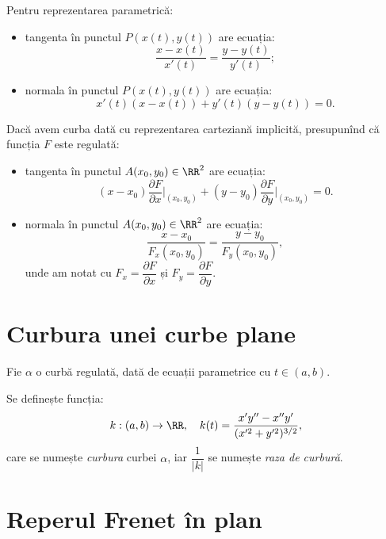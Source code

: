 Pentru reprezentarea parametrică:
\begin{itemize}
  \item tangenta în punctul $ P(x(t), y(t)) $ are ecuația:
    \[
      \dfrac{x - x(t)}{x'(t)} = \dfrac{y - y(t)}{y'(t)};
    \]
  \item normala în punctul $ P(x(t), y(t)) $ are ecuația:
    \[
      x'(t)(x - x(t)) + y'(t)(y - y(t)) = 0.
    \]
\end{itemize}

Dacă avem curba dată cu reprezentarea carteziană implicită, presupunînd că
funcția $ F $ este regulată:
\begin{itemize}
  \item tangenta în punctul $ A(x_0, y_0) \in \RR^2 $ are ecuația:
    \[
      (x - x_0) \dfrac{\partial F}{\partial x} \Big|_{(x_0, y_0)} + %
      (y - y_0) \dfrac{\partial F}{\partial y} \Big|_{(x_0, y_0)} = 0.
    \]
  \item normala în punctul $ A(x_0, y_0) \in \RR^2 $ are ecuația:
    \[
      \dfrac{x - x_0}{F_x(x_0, y_0)} = \dfrac{y - y_0}{F_y(x_0, y_0)},
    \]
    unde am notat cu $ F_x = \dfrac{\partial F}{\partial x} $ și
    $ F_y = \dfrac{\partial F}{\partial y} $.
\end{itemize}


\section{Curbura unei curbe plane}

Fie $ \alpha $ o curbă regulată, dată de ecuații parametrice cu $ t \in (a, b) $.

Se definește funcția:
\[
  k : (a, b) \to \RR, \quad k(t) = \dfrac{x'y^{\prime\prime} - x^{\prime\prime} y'}{%
  (x^{\prime 2} + y^{\prime 2})^{3/2}},
\]
care se numește \emph{curbura} curbei $ \alpha $, iar $ \dfrac{1}{|k|} $ se
numește \emph{raza de curbură}.


\section{Reperul Frenet în plan}

